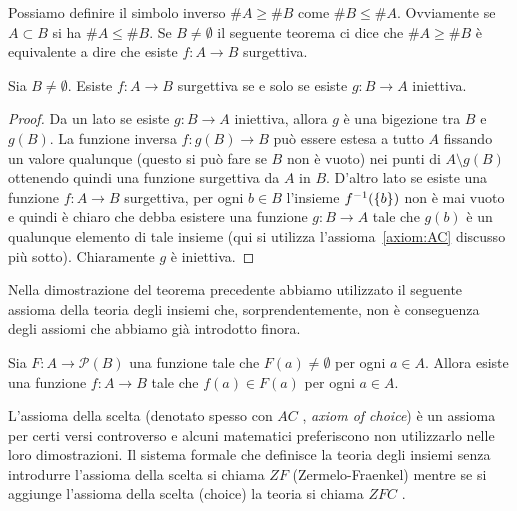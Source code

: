 Possiamo definire il simbolo inverso $\#A \ge \#B$ 
come $\#B\le \#A$.
Ovviamente se $A\subset B$ si ha $\#A \le \#B$.
Se $B\neq \emptyset$ 
il seguente teorema ci dice che $\#A \ge \#B$ 
è equivalente a dire che 
esiste $f\colon A \to B$
surgettiva. 
%
\begin{theorem}\label{th:95444}
  Sia $B\neq \emptyset$.
  Esiste $f\colon A\to B$ surgettiva 
  se e solo se esiste $g\colon B\to A$ iniettiva.
\end{theorem}
% 
\begin{proof}
Da un lato se esiste $g\colon B\to A$ iniettiva, allora $g$ è una bigezione 
tra $B$ e $g(B)$. La funzione inversa $f\colon g(B) \to B$ 
può essere estesa a tutto $A$ fissando un valore qualunque 
(questo si può fare se $B$ non è vuoto) nei punti di $A\setminus g(B)$
ottenendo quindi una funzione surgettiva da $A$ in $B$.
D'altro lato se esiste una funzione $f\colon A\to B$ surgettiva,
per ogni $b\in B$ l'insieme $f^{-1}({\left\{ b \right\}})$ non è mai 
vuoto e quindi è chiaro che debba esistere 
una funzione $g\colon B\to A$ tale che $g(b)$ è un qualunque elemento 
di tale insieme
(qui si utilizza l'assioma~\ref{axiom:AC} discusso più sotto). 
Chiaramente $g$ è iniettiva.
\end{proof}

Nella dimostrazione del teorema precedente abbiamo utilizzato il seguente assioma 
della teoria degli insiemi che, sorprendentemente, non è conseguenza degli assiomi 
che abbiamo già introdotto finora.

\begin{axiom}%
  \label{axiom:AC}%
  Sia $F\colon A \to \mathcal P(B)$
  una funzione tale che $F(a)\neq \emptyset$ 
  per ogni $a\in A$. Allora esiste una funzione
  $f\colon A \to B$ tale che $f(a)\in F(a)$
  per ogni $a\in A$.
\end{axiom}

L'assioma della scelta (denotato spesso con \emph{$AC$}%
%
, \emph{axiom of choice})
è un assioma per certi versi controverso
e alcuni matematici preferiscono non utilizzarlo nelle loro dimostrazioni.
Il sistema formale che definisce la teoria degli insiemi senza 
introdurre l'assioma della scelta 
si chiama \emph{$ZF$}%
%
 (Zermelo-Fraenkel) mentre 
se si aggiunge l'assioma della scelta (choice) la teoria si chiama 
\emph{$ZFC$}%
%
.

